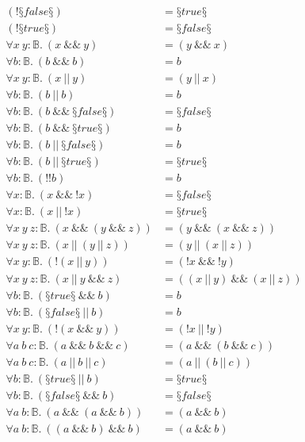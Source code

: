 \begin{conjectureset}[H]
\begin{align}
(!§false§) &= §true§\ \\
(!§true§) &= §false§\ \\
\forall x\ y : \mathbb{B}.\ (x\ \&\&\ y) &= (y\ \&\&\ x)\ \\
\forall b : \mathbb{B}.\ (b\ \&\&\ b) &= b\ \\
\forall x\ y : \mathbb{B}.\ (x\ ||\ y) &= (y\ ||\ x)\ \\
\forall b : \mathbb{B}.\ (b\ ||\ b) &= b\ \\
\forall b : \mathbb{B}.\ (b\ \&\&\ §false§) &= §false§\ \\
\forall b : \mathbb{B}.\ (b\ \&\&\ §true§) &= b\ \\
\forall b : \mathbb{B}.\ (b\ ||\ §false§) &= b\ \\
\forall b : \mathbb{B}.\ (b\ ||\ §true§) &= §true§\ \\
\forall b : \mathbb{B}.\ (!!b) &= b\ \\
\forall x : \mathbb{B}.\ (x\ \&\&\ !x) &= §false§\ \\
\forall x : \mathbb{B}.\ (x\ ||\ !x) &= §true§\ \\
\forall x\ y\ z : \mathbb{B}.\ (x\ \&\&\ (y\ \&\&\ z)) &= (y\ \&\&\ (x\ \&\&\ z))\ \\
\forall x\ y\ z : \mathbb{B}.\ (x\ ||\ (y\ ||\ z)) &= (y\ ||\ (x\ ||\ z))\ \\
\forall x\ y : \mathbb{B}.\ (!(x\ ||\ y)) &= (!x\ \&\&\ !y)\ \\
\forall x\ y\ z : \mathbb{B}.\ (x\ ||\ y\ \&\&\ z) &= ((x\ ||\ y)\ \&\&\ (x\ ||\ z))\ \\
\forall b : \mathbb{B}.\ (§true§\ \&\&\ b) &= b\ \\
\forall b : \mathbb{B}.\ (§false§\ ||\ b) &= b\ \\
\forall x\ y : \mathbb{B}.\ (!(x\ \&\&\ y)) &= (!x\ ||\ !y)\ \\
\forall a\ b\ c : \mathbb{B}.\ (a\ \&\&\ b\ \&\&\ c) &= (a\ \&\&\ (b\ \&\&\ c))\ \\
\forall a\ b\ c : \mathbb{B}.\ (a\ ||\ b\ ||\ c) &= (a\ ||\ (b\ ||\ c))\ \\
\forall b : \mathbb{B}.\ (§true§\ ||\ b) &= §true§\ \\
\forall b : \mathbb{B}.\ (§false§\ \&\&\ b) &= §false§\ \\
\forall a\ b : \mathbb{B}.\ (a\ \&\&\ (a\ \&\&\ b)) &= (a\ \&\&\ b)\ \\
\forall a\ b : \mathbb{B}.\ ((a\ \&\&\ b)\ \&\&\ b) &= (a\ \&\&\ b)\ \\

\end{align}
\end{conjectureset}
